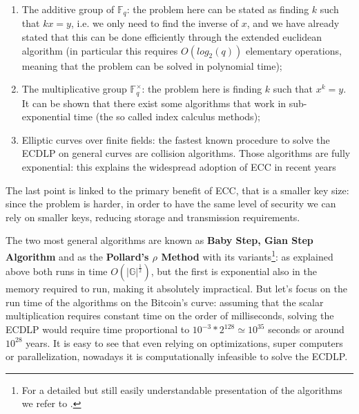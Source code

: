 \begin{enumerate}
	\item The additive group of $\mathbb{F}_q$: the problem here can be stated as finding $k$ such that $kx = y$, i.e. we only need to find the inverse of $x$, and we have already stated that this can be done efficiently through the extended euclidean algorithm (in particular this requires $O(log_2(q))$ elementary operations, meaning that the problem can be solved in polynomial time);
	\item The multiplicative group $\mathbb{F}_q^{\times}$: the problem here is finding $k$ such that $x^k = y$. It can be shown that there exist some algorithms that work in sub-exponential time (the so called index calculus methods);
	\item Elliptic curves over finite fields: the fastest known procedure to solve the ECDLP on general curves are collision algorithms. Those algorithms are fully exponential: this explains the widespread adoption of ECC in recent years
\end{enumerate}
\noindent
The last point is linked to the primary benefit of ECC, that is a smaller key size: since the problem is harder, in order to have the same level of security we can rely on smaller keys, reducing storage and transmission requirements.

\bigskip
\noindent
The two most general algorithms are known as {\bf Baby Step, Gian Step Algorithm} and as the {\bf Pollard's $\rho$ Method} with its variants\footnote{For a detailed but still easily understandable presentation of the algorithms we refer to \cite{RefWork:4}.}: as explained above both runs in time $O(|\mathbb{G}|^{\frac{1}{2}})$, but the first is exponential also in the memory required to run, making it absolutely impractical. But let's focus on the run time of the algorithms on the Bitcoin's curve: assuming that the scalar multiplication requires constant time on the order of milliseconds, solving the ECDLP would require time proportional to $10^{-3} * 2^{128} \simeq 10^{35}$ seconds or around $10^{28}$ years. It is easy to see that even relying on optimizations, super computers or parallelization, nowadays it is computationally infeasible to solve the ECDLP. 
